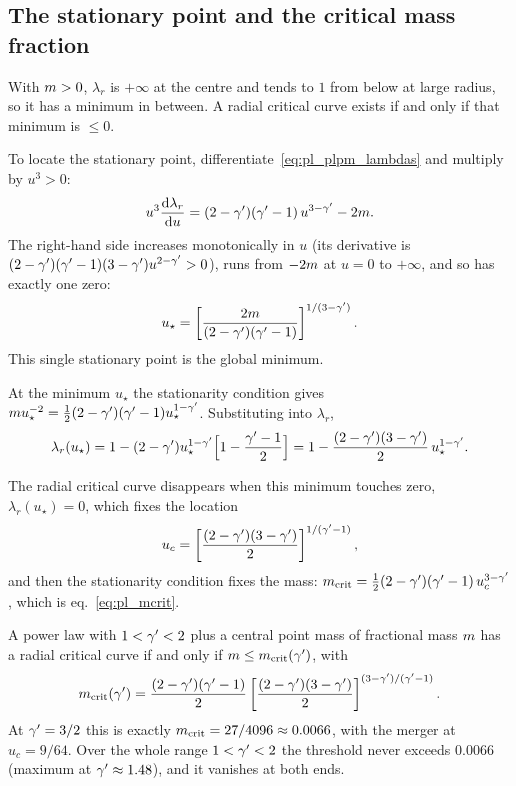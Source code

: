 \subsection{The stationary point and the critical mass fraction}

With $m>0$, $\lambda_r$ is $+\infty$ at the centre and tends to $1$
from below at large radius, so it has a minimum in between.  A radial
critical curve exists if and only if that minimum is $\le0$.

\begin{derivation}
To locate the stationary point, differentiate~\eqref{eq:pl_plpm_lambdas}
and multiply by $u^3>0$:
\[
  u^3\frac{\mathrm{d} \lambda_r}{\mathrm{d} u} = (2-\gamma')(\gamma'-1)\,u^{3-\gamma'}-2m .
\]
The right-hand side increases monotonically in $u$ (its derivative is
$(2-\gamma')(\gamma'-1)(3-\gamma')u^{2-\gamma'}>0$), runs from $-2m$ at $u=0$ to
$+\infty$, and so has exactly one zero:
\[
  u_\star=\left[\frac{2m}{(2-\gamma')(\gamma'-1)}\right]^{1/(3-\gamma')} .
\]
This single stationary point is the global minimum.

At the minimum $u_\star$ the stationarity condition
gives $m u_\star^{-2}=\tfrac12(2-\gamma')(\gamma'-1)u_\star^{1-\gamma'}$.
Substituting into $\lambda_r$,
\[
  \lambda_r(u_\star) = 1-(2-\gamma')u_\star^{1-\gamma'}\Big[1-\frac{\gamma'-1}{2}\Big]
                     = 1-\frac{(2-\gamma')(3-\gamma')}{2}\,u_\star^{1-\gamma'} .
\]

The radial critical curve disappears when this
minimum touches zero, $\lambda_r(u_\star)=0$, which fixes the location
\[
  u_c=\left[\frac{(2-\gamma')(3-\gamma')}{2}\right]^{1/(\gamma'-1)} ,
\]
and then the stationarity condition fixes the mass:
$m_{\rm crit}=\tfrac12(2-\gamma')(\gamma'-1)\,u_c^{3-\gamma'}$, which is
eq.~\eqref{eq:pl_mcrit}.
\end{derivation}

\begin{keybox}
A power law with $1<\gamma'<2$ plus a central point mass of fractional mass
$m$ has a radial critical curve if and only if $m\le m_{\rm crit}(\gamma')$, with
\begin{equation}
    m_{\rm crit}(\gamma')=\frac{(2-\gamma')(\gamma'-1)}{2}
      \left[\frac{(2-\gamma')(3-\gamma')}{2}\right]^{(3-\gamma')/(\gamma'-1)} .
    \label{eq:pl_mcrit}
\end{equation}
At $\gamma'=3/2$ this is exactly $m_{\rm crit}=27/4096\approx0.0066$,
with the merger at $u_c=9/64$.  Over the whole range $1<\gamma'<2$ the
threshold never exceeds $0.0066$ (maximum at $\gamma'\approx1.48$), and it
vanishes at both ends.
\end{keybox}


